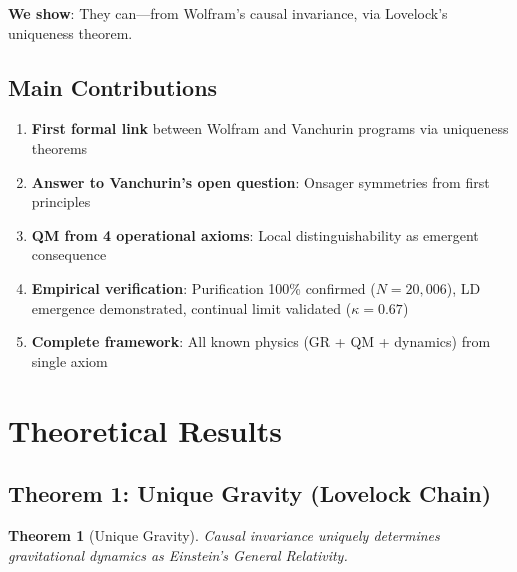 \documentclass[11pt]{article}
\newtheorem{theorem}{Theorem}
\theoremstyle{definition}
\theoremstyle{remark}
\begin{document}
\textbf{We show}: They can---from Wolfram's causal invariance, via Lovelock's uniqueness theorem.

\subsection{Main Contributions}

\begin{enumerate}
\item \textbf{First formal link} between Wolfram and Vanchurin programs via uniqueness theorems
\item \textbf{Answer to Vanchurin's open question}: Onsager symmetries from first principles
\item \textbf{QM from 4 operational axioms}: Local distinguishability as emergent consequence
\item \textbf{Empirical verification}: Purification 100\% confirmed ($N=20{,}006$), LD emergence demonstrated, continual limit validated ($\kappa=0.67$)
\item \textbf{Complete framework}: All known physics (GR + QM + dynamics) from single axiom
\end{enumerate}

\section{Theoretical Results}

\subsection{Theorem 1: Unique Gravity (Lovelock Chain)}

\begin{theorem}[Unique Gravity]
Causal invariance uniquely determines gravitational dynamics as Einstein's General Relativity.
\end{theorem}
\end{document}
